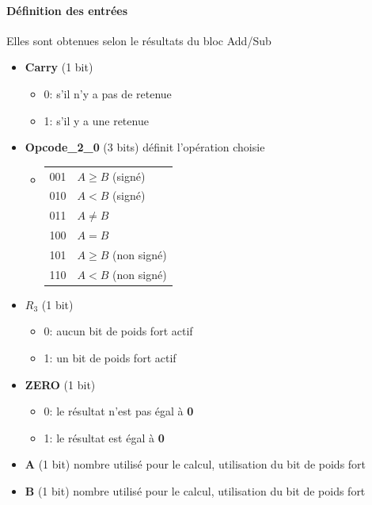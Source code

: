 \documentclass[a4paper]{article}
\begin{document}
\begin{tcolorbox}[colframe=Monokaimagenta,colback=white]

\paragraph{Définition des entrées}
Elles sont obtenues selon le résultats du bloc Add/Sub
\begin{itemize}
\item \textbf{Carry} (1 bit)
     \begin{itemize}
            \item 0: s'il n'y a pas de retenue
            \item 1: s'il y a une retenue
        \end{itemize}
\item \textbf{Opcode\_2\_0} (3 bits) définit l'opération choisie
     \begin{itemize}
            \item \begin{tabular}{ |l | l| }
                    001   & $A \ge B$ (signé) \\
                    010   & $A < B$ (signé) \\
                    011   & $A \ne B$\\
                    100   & $A = B$ \\
                    101   & $A \ge B$ (non signé) \\
                    110   & $A < B$ (non signé) \\
    \end{tabular}
        \end{itemize}
\item $R_3$ (1 bit) 
\begin{itemize}
            \item 0: aucun bit de poids fort actif
            \item 1: un bit de poids fort actif
        \end{itemize}
\item \textbf{ZERO} (1 bit) 
    \begin{itemize}
            \item 0: le résultat n'est pas égal à \textbf{0}
            \item 1: le résultat est égal à \textbf{0}
        \end{itemize}
\item \textbf{A} (1 bit) nombre utilisé pour le calcul, utilisation du bit de poids fort
\item \textbf{B} (1 bit) nombre utilisé pour le calcul, utilisation du bit de poids fort
\end{itemize}


\end{tcolorbox}
\end{document}
